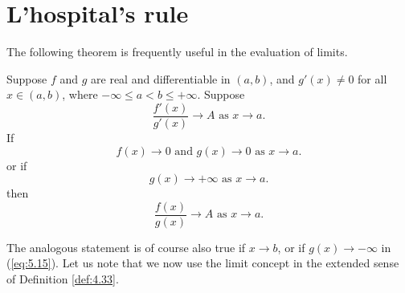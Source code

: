 \section{L'hospital's rule}
The following theorem is frequently useful in the evaluation of limits.

\begin{thm}
    \label{thm:5.13}
    Suppose $f$ and $g$ are real and differentiable in $(a, b)$, 
    and $g'(x) \neq 0$ for all $x \in (a, b)$, 
    where $-\infty \leq a < b \leq + \infty$. 
    Suppose
    \begin{equation}
        \label{eq:5.13}
        \frac{f'(x)}{g'(x)}\rightarrow A 
        \text{ as } x \rightarrow a.
    \end{equation}
    If 
    \begin{equation}
        \label{eq:5.14}
        f(x) \rightarrow 0
        \text{ and }
        g(x) \rightarrow 0
        \text{ as } x \rightarrow a.
    \end{equation}
    or if 
    \begin{equation}
        \label{eq:5.15}
        g(x) \rightarrow +\infty 
        \text{ as } x \rightarrow a.
    \end{equation}
    then
    \begin{equation}
        \label{eq:5.16}
        \frac{f(x)}{g(x)} \rightarrow A
        \text{ as } x \rightarrow a.
    \end{equation}
\end{thm}
The analogous statement is of course also true if $x \rightarrow b$, 
or if $g(x) \rightarrow -\infty $ in (\ref{eq:5.15}). 
Let us note that we now use the limit concept in the extended sense of
Definition \ref{def:4.33}.
